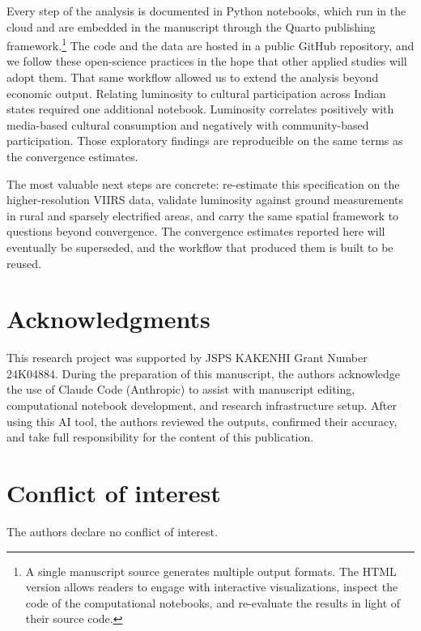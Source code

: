 \documentclass[
  letterpaper,
  DIV=11,
  numbers=noendperiod]{scrartcl}
\begin{document}
Every step of the analysis is documented in Python notebooks, which run
in the cloud and are embedded in the manuscript through the Quarto
publishing framework.\footnote{A single manuscript source generates
  multiple output formats. The HTML version allows readers to engage
  with interactive visualizations, inspect the code of the computational
  notebooks, and re-evaluate the results in light of their source code.}
The code and the data are hosted in a public GitHub repository, and we
follow these open-science practices in the hope that other applied
studies will adopt them. That same workflow allowed us to extend the
analysis beyond economic output. Relating luminosity to cultural
participation across Indian states required one additional notebook.
Luminosity correlates positively with media-based cultural consumption
and negatively with community-based participation. Those exploratory
findings are reproducible on the same terms as the convergence
estimates.

The most valuable next steps are concrete: re-estimate this
specification on the higher-resolution VIIRS data, validate luminosity
against ground measurements in rural and sparsely electrified areas, and
carry the same spatial framework to questions beyond convergence. The
convergence estimates reported here will eventually be superseded, and
the workflow that produced them is built to be reused.

\section*{Acknowledgments}\label{acknowledgments}

This research project was supported by JSPS KAKENHI Grant Number
24K04884. During the preparation of this manuscript, the authors
acknowledge the use of Claude Code (Anthropic) to assist with manuscript
editing, computational notebook development, and research infrastructure
setup. After using this AI tool, the authors reviewed the outputs,
confirmed their accuracy, and take full responsibility for the content
of this publication.

\section*{Conflict of interest}\label{conflict-of-interest}

The authors declare no conflict of interest.
\end{document}
